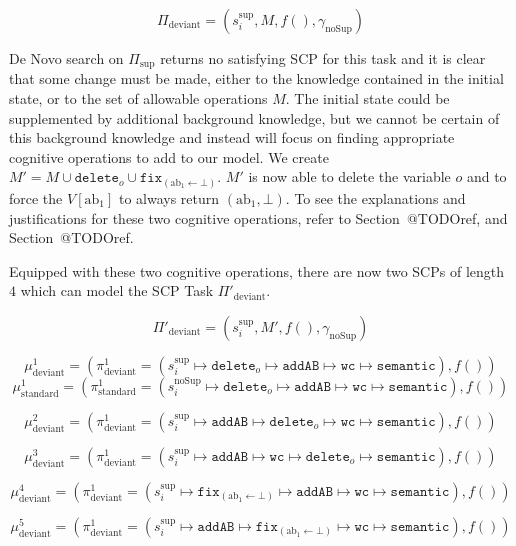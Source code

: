 \[\Pi_\text{deviant}=(s_i^{\text{sup}},M,f(),\gamma_{\text{noSup}})\]

De Novo search on $\Pi_\text{sup}$ returns no satisfying SCP for this task and it is clear that some change must be made, either to the knowledge contained in the initial state, or to the set of allowable operations $M$. The initial state could be supplemented by additional background knowledge, but we cannot be certain of this background knowledge and instead will focus on finding appropriate cognitive operations to add to our model. We create $M'=M\cup \texttt{delete}_o \cup \texttt{fix}_{(\text{ab}_1\leftarrow \bot)}$. $M'$ is now able to delete the variable $o$ and to force the $V[\text{ab}_1]$ to always return $(\text{ab}_1,\bot)$. To see the explanations and justifications for these two cognitive operations, refer to Section~@TODOref, and Section~@TODOref.

Equipped with these two cognitive operations, there are now two SCPs of length $4$ which can model the SCP Task $\Pi'_\text{deviant}$.

\[\Pi'_\text{deviant}=(s_i^{\text{sup}},M',f(),\gamma_{\text{noSup}})\]

\[\mu^1_\text{deviant}=(\pi^1_\text{deviant}=(s_i^{\text{sup}} \longmapsto \texttt{delete}_o \longmapsto \texttt{addAB} \longmapsto \texttt{wc} \longmapsto \texttt{semantic}),f())\]
\[\mu^1_\text{standard}=(\pi^1_\text{standard}=(s_i^{\text{noSup}} \longmapsto \texttt{delete}_o \longmapsto \texttt{addAB} \longmapsto \texttt{wc} \longmapsto \texttt{semantic}),f())\]


\[\mu^2_\text{deviant}=(\pi^1_\text{deviant}=(s_i^{\text{sup}} \longmapsto \texttt{addAB} \longmapsto \texttt{delete}_o \longmapsto \texttt{wc} \longmapsto \texttt{semantic}),f())\]


\[\mu^3_\text{deviant}=(\pi^1_\text{deviant}=(s_i^{\text{sup}} \longmapsto \texttt{addAB} \longmapsto \texttt{wc} \longmapsto  \texttt{delete}_o \longmapsto \texttt{semantic}),f())\]

\[\mu^4_\text{deviant}=(\pi^1_\text{deviant}=(s_i^{\text{sup}} \longmapsto \texttt{fix}_{(\text{ab}_1\leftarrow \bot)} \longmapsto \texttt{addAB} \longmapsto \texttt{wc} \longmapsto \texttt{semantic}),f())\]

\[\mu^5_\text{deviant}=(\pi^1_\text{deviant}=(s_i^{\text{sup}} \longmapsto \texttt{addAB} \longmapsto \texttt{fix}_{(\text{ab}_1\leftarrow \bot)} \longmapsto \texttt{wc} \longmapsto \texttt{semantic}),f())\]



